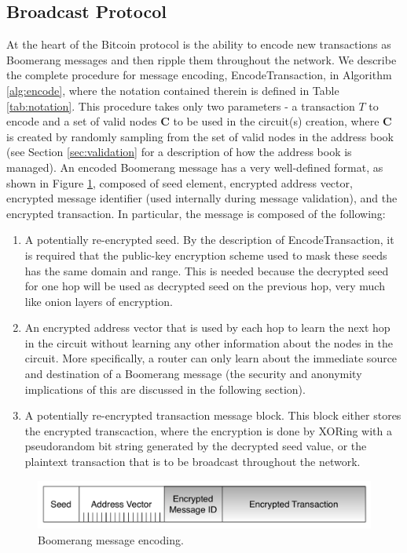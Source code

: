 \subsection{Broadcast Protocol}

At the heart of the Bitcoin protocol is the ability to encode new transactions as Boomerang messages and then ripple them throughout the network. We describe the complete procedure for message encoding, {\sf EncodeTransaction}, in Algorithm \ref{alg:encode}, where the notation contained therein is defined in Table \ref{tab:notation}. This procedure takes only two parameters - a transaction $T$ to encode and a set of valid nodes $\mathbf{C}$ to be used in the circuit(s) creation, where $\mathbf{C}$ is created by randomly sampling from the set of valid nodes in the address book (see Section \ref{sec:validation} for a description of how the address book is managed). An encoded Boomerang message has a very well-defined format, as shown in Figure \ref{fig:boomerang_message}, composed of seed element, encrypted address vector, encrypted message identifier (used internally during message validation), and the encrypted transaction. In particular, the message is composed of the following:
\begin{enumerate}
	\item A potentially re-encrypted seed. By the description of {\sf EncodeTransaction}, it is required that the public-key encryption scheme used to mask these seeds has the same domain and range. This is needed because the decrypted seed for one hop will be used as decrypted seed on the previous hop, very much like onion layers of encryption.
	\item An encrypted address vector that is used by each hop to learn the next hop in the circuit without learning any other information about the nodes in the circuit. More specifically, a router can only learn about the immediate source and destination of a Boomerang message (the security and anonymity implications of this are discussed in the following section).
	\item A potentially re-encrypted transaction message block. This block either stores the encrypted transcaction, where the encryption is done by XORing with a pseudorandom bit string generated by the decrypted seed value, or the plaintext transaction that is to be broadcast throughout the network.
\end{enumerate}

\begin{figure}[ht!]
\begin{center}
\includegraphics[scale=0.35]{./images/boomerang_message.pdf}
\caption{Boomerang message encoding.}
\label{fig:boomerang_message}
\end{center}
\end{figure}

